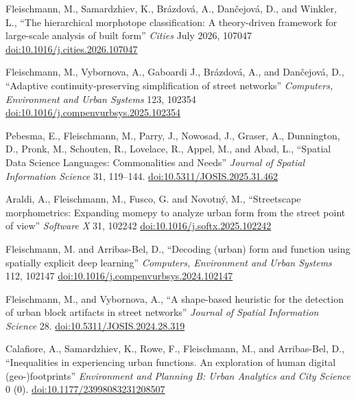 \documentclass[12pt,a4paper]{report}
\begin{document}
    \begin{tablist}

        \item[2026] \tab{}Fleischmann, M., Samardzhiev, K., Brázdová, A., Dančejová, D., and Winkler, L., \enquote{The hierarchical morphotope classification: A theory-driven framework for large-scale analysis of built form} \textit{Cities} July 2026, 107047 \href{https://doi.org/10.1016/j.cities.2026.107047}{doi:10.1016/j.cities.2026.107047}

        \item[2026] \tab{}Fleischmann, M., Vybornova, A., Gaboardi J., Brázdová, A., and Dančejová, D., \enquote{Adaptive continuity-preserving simplification of street networks} \textit{Computers, Environment and Urban Systems} 123, 102354 \href{https://doi.org/10.1016/j.compenvurbsys.2025.102354}{doi:10.1016/j.compenvurbsys.2025.102354}

        \item[2025] \tab{}Pebesma, E., Fleischmann, M., Parry, J., Nowosad, J., Graser, A., Dunnington, D., Pronk, M., Schouten, R., Lovelace, R., Appel, M., and Abad, L., \enquote{Spatial Data Science Languages: Commonalities and Needs} \textit{Journal of Spatial Information Science} 31, 119--144. \href{https://doi.org/10.5311/JOSIS.2025.31.462}{doi:10.5311/JOSIS.2025.31.462}

        \item[2025] \tab{}Araldi, A., Fleischmann, M., Fusco, G. and Novotný, M., \enquote{Streetscape morphometrics: Expanding momepy to analyze urban form from the street point of view} \textit{Software X} 31, 102242 \href{https://doi.org/10.1016/j.softx.2025.102242}{doi:10.1016/j.softx.2025.102242}

        \item[2024] \tab{}Fleischmann, M. and Arribas-Bel, D., \enquote{Decoding (urban) form and function using spatially explicit deep learning} \textit{Computers, Environment and Urban Systems} 112, 102147 \href{https://doi.org/10.1016/j.compenvurbsys.2024.102147}{doi:10.1016/j.compenvurbsys.2024.102147}

        \item[2024] \tab{}Fleischmann, M., and Vybornova, A., \enquote{A shape-based heuristic for the detection of urban block artifacts in street networks} \textit{Journal of Spatial Information Science} 28. \href{https://doi.org/10.5311/JOSIS.2024.28.319}{doi:10.5311/JOSIS.2024.28.319}

        \item[2023] \tab{}Calafiore, A., Samardzhiev, K., Rowe, F., Fleischmann, M., and Arribas-Bel, D., \enquote{Inequalities in experiencing urban functions. An exploration of human digital (geo-)footprints} \textit{Environment and Planning B: Urban Analytics and City Science} 0 (0). \href{https://doi.org/10.1177/23998083231208507}{doi:10.1177/23998083231208507}


\end{tablist}
\end{document}
